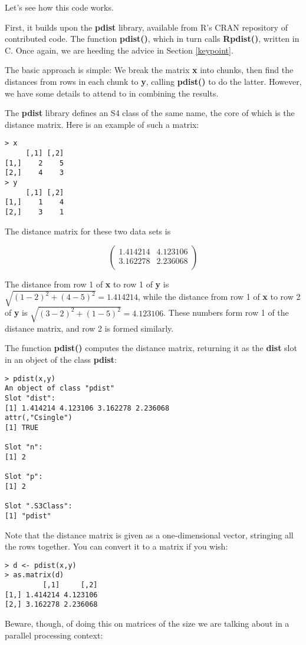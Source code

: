 Let's see how this code works.

First, it builds upon the {\bf pdist} library, available from R's CRAN
repository of contributed code.  The function {\bf pdist()}, which in
turn calls {\bf Rpdist()}, written in C.  Once again, we are heeding the
advice in Section \ref{keypoint}.

The basic approach is simple:  We break the matrix {\bf x} into chunks,
then find the distances from rows in each chunk to {\bf y}, calling {\bf
pdist()} to do the latter.  However, we have some details to attend to
in combining the results.

The {\bf pdist} library defines an S4 class of the same name, the core
of which is the distance matrix.  Here is an example of such a matrix:

\begin{Verbatim}[fontsize=\relsize{-2}]
> x
     [,1] [,2]
[1,]    2    5
[2,]    4    3
> y
     [,1] [,2]
[1,]    1    4
[2,]    3    1
\end{Verbatim}

The distance matrix for these two data sets is

\begin{equation}
\left (
\begin{array}{rr}
1.414214 & 4.123106 \\
3.162278 & 2.236068 \\
\end{array}
\right )
\end{equation}

The distance from row 1 of {\bf x} to row 1 of {\bf y} is $\sqrt{(1-2)^2
+ (4-5)^2} = 1.414214$, while the distance from row 1 of {\bf x} to row
2 of {\bf y} is $\sqrt{(3-2)^2 + (1-5)^2} = 4.123106$.  These numbers
form row 1 of the distance matrix, and row 2 is formed similarly.

The function {\bf pdist()} computes the distance matrix, returning it as
the {\bf dist} slot in an object of the class {\bf pdist}:

\begin{Verbatim}[fontsize=\relsize{-2}]
> pdist(x,y)
An object of class "pdist"
Slot "dist":
[1] 1.414214 4.123106 3.162278 2.236068
attr(,"Csingle")
[1] TRUE

Slot "n":
[1] 2

Slot "p":
[1] 2

Slot ".S3Class":
[1] "pdist"
\end{Verbatim}

Note that the distance matrix is given as a one-dimensional vector,
stringing all the rows together.  You can convert it to a matrix if you
wish:

\begin{Verbatim}[fontsize=\relsize{-2}]
> d <- pdist(x,y)
> as.matrix(d)
         [,1]     [,2]
[1,] 1.414214 4.123106
[2,] 3.162278 2.236068
\end{Verbatim}

Beware, though, of doing this on matrices of the size we are talking
about in a parallel processing context:

